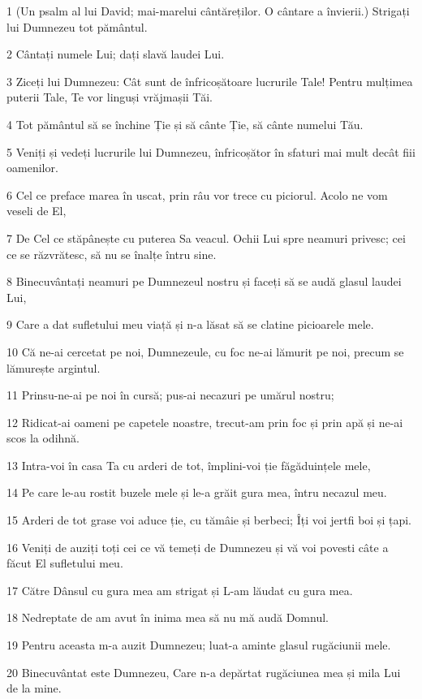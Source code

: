 \par 1 (Un psalm al lui David; mai-marelui cântăreților. O cântare a învierii.) Strigați lui Dumnezeu tot pământul.
\par 2 Cântați numele Lui; dați slavă laudei Lui.
\par 3 Ziceți lui Dumnezeu: Cât sunt de înfricoșătoare lucrurile Tale! Pentru mulțimea puterii Tale, Te vor linguși vrăjmașii Tăi.
\par 4 Tot pământul să se închine Ție și să cânte Ție, să cânte numelui Tău.
\par 5 Veniți și vedeți lucrurile lui Dumnezeu, înfricoșător în sfaturi mai mult decât fiii oamenilor.
\par 6 Cel ce preface marea în uscat, prin râu vor trece cu piciorul. Acolo ne vom veseli de El,
\par 7 De Cel ce stăpânește cu puterea Sa veacul. Ochii Lui spre neamuri privesc; cei ce se răzvrătesc, să nu se înalțe întru sine.
\par 8 Binecuvântați neamuri pe Dumnezeul nostru și faceți să se audă glasul laudei Lui,
\par 9 Care a dat sufletului meu viață și n-a lăsat să se clatine picioarele mele.
\par 10 Că ne-ai cercetat pe noi, Dumnezeule, cu foc ne-ai lămurit pe noi, precum se lămurește argintul.
\par 11 Prinsu-ne-ai pe noi în cursă; pus-ai necazuri pe umărul nostru;
\par 12 Ridicat-ai oameni pe capetele noastre, trecut-am prin foc și prin apă și ne-ai scos la odihnă.
\par 13 Intra-voi în casa Ta cu arderi de tot, împlini-voi ție făgăduințele mele,
\par 14 Pe care le-au rostit buzele mele și le-a grăit gura mea, întru necazul meu.
\par 15 Arderi de tot grase voi aduce ție, cu tămâie și berbeci; Îți voi jertfi boi și țapi.
\par 16 Veniți de auziți toți cei ce vă temeți de Dumnezeu și vă voi povesti câte a făcut El sufletului meu.
\par 17 Către Dânsul cu gura mea am strigat și L-am lăudat cu gura mea.
\par 18 Nedreptate de am avut în inima mea să nu mă audă Domnul.
\par 19 Pentru aceasta m-a auzit Dumnezeu; luat-a aminte glasul rugăciunii mele.
\par 20 Binecuvântat este Dumnezeu, Care n-a depărtat rugăciunea mea și mila Lui de la mine.


